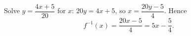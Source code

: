 Solve \(y=\dfrac{4x+5}{20}\) for \(x\): \(20y=4x+5\), so \(x=\dfrac{20y-5}{4}\). Hence
\[
\boxed{f^{-1}(x)=\dfrac{20x-5}{4}=5x-\dfrac{5}{4}}.
\]
